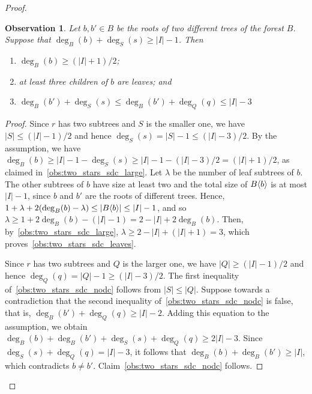 \documentclass[11pt,a4paper,colorlinks=true,urlcolor=blue,citecolor=red]{article}
\theoremstyle{plain}
\newtheorem{observation}[theorem]{Observation}
\begin{document}
\begin{proof}
  \begin{observation}\label{obs:two_stars_sdc}
    Let $b,b'\in B$ be the roots of two different trees of the
    forest $B$. Suppose that $\deg_B(b)+\deg_S(s)\geq |I|-1$. Then
    \begin{enumerate}[label={(P\arabic*)}]\setlength{\itemindent}{3\labelsep}
    \item\label{obs:two_stars_sdc_large} $\deg_B(b)\geq(|I|+1)/2$;
    \item\label{obs:two_stars_sdc_leaves} at least three children of $b$
      are leaves; and
    \item\label{obs:two_stars_sdc_nodc} $\deg_B(b')+\deg_S(s)\leq
      \deg_B(b')+\deg_Q(q)\leq |I|-3$
    \end{enumerate}
  \end{observation}
  \begin{proof}
    Since $r$ has two subtrees and $S$ is the smaller one, we have
    $|S|\leq (|I|-1)/2$ and hence $\deg_S(s)=|S|-1\leq (|I|-3)/2$. By
    the assumption, we have $\deg_B(b)\geq|I|-1-\deg_S(s)\geq
    |I|-1-(|I|-3)/2=(|I|+1)/2$, as claimed
    in~\ref{obs:two_stars_sdc_large}. Let $\lambda$ be the number of
    leaf subtrees of $b$. The other subtrees of $b$ have size at least
    two and the total size of $B\langle{b}\rangle$ is at most $|I|-1$, since $b$
    and $b'$ are the roots of different trees. Hence,
    $1+\lambda+2(\deg_B(b)-\lambda)\leq|B\langle{b}\rangle|\leq |I|-1$, and so
    $\lambda\geq 1+2\deg_B(b)-(|I|-1)=2-|I|+2\deg_B(b)$. Then,
    by~\ref{obs:two_stars_sdc_large}, $\lambda\geq 2-|I|+(|I|+1)=3$,
    which proves~\ref{obs:two_stars_sdc_leaves}.

    Since $r$ has two subtrees and $Q$ is the larger one, we have
    $|Q|\geq (|I|-1)/2$ and hence $\deg_Q(q)=|Q|-1\geq (|I|-3)/2$. The
    first inequality of~\ref{obs:two_stars_sdc_nodc} follows from
    $|S|\leq|Q|$. Suppose towards a contradiction that the second
    inequality of~\ref{obs:two_stars_sdc_nodc} is false, that is,
    $\deg_B(b')+\deg_Q(q)\geq |I|-2$. Adding this equation to the
    assumption, we obtain $\deg_B(b)+\deg_B(b')+\deg_S(s)+\deg_Q(q)\geq
    2|I|-3$. Since $\deg_S(s)+\deg_Q(q)=|I|-3$, it follows that
    $\deg_B(b)+\deg_B(b')\geq|I|$, which contradicts $b\neq b'$.
    Claim~\ref{obs:two_stars_sdc_nodc} follows.
  \end{proof}


\end{proof}
\end{document}
